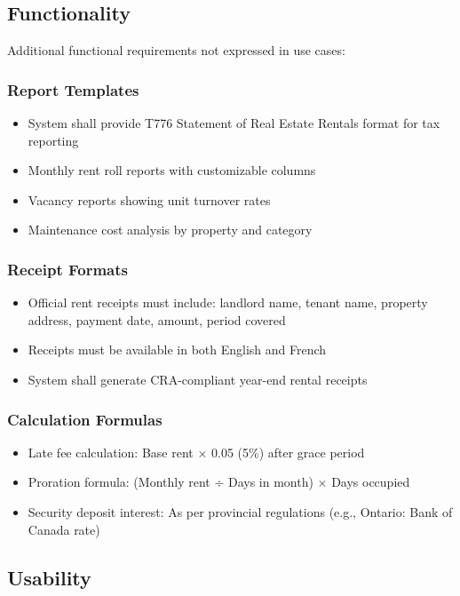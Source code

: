 \documentclass[12pt]{article}
\begin{document}
\subsection{Functionality}
Additional functional requirements not expressed in use cases:

\subsubsection{Report Templates}
\begin{itemize}
    \item System shall provide T776 Statement of Real Estate Rentals format for tax reporting
    \item Monthly rent roll reports with customizable columns
    \item Vacancy reports showing unit turnover rates
    \item Maintenance cost analysis by property and category
\end{itemize}

\subsubsection{Receipt Formats}
\begin{itemize}
    \item Official rent receipts must include: landlord name, tenant name, property address, payment date, amount, period covered
    \item Receipts must be available in both English and French
    \item System shall generate CRA-compliant year-end rental receipts
\end{itemize}

\subsubsection{Calculation Formulas}
\begin{itemize}
    \item Late fee calculation: Base rent × 0.05 (5\%) after grace period
    \item Proration formula: (Monthly rent ÷ Days in month) × Days occupied
    \item Security deposit interest: As per provincial regulations (e.g., Ontario: Bank of Canada rate)
\end{itemize}

\subsection{Usability}
\end{document}
